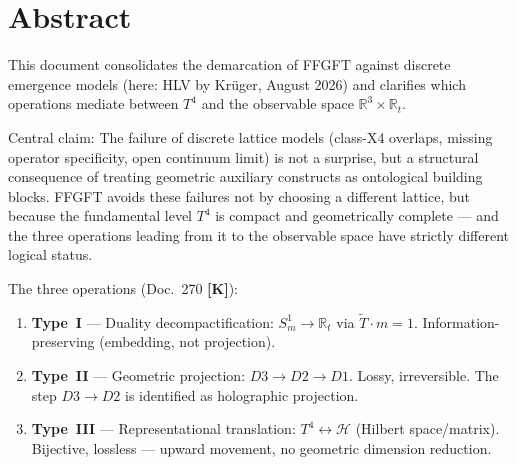 
\providecommand{\K}{}\renewcommand{\K}{\textbf{[K]}}
\providecommand{\B}{}\renewcommand{\B}{\textbf{[B]}}
\renewcommand{\S}{\textbf{[S]}}
\providecommand{\SETZ}{}\renewcommand{\SETZ}{\textbf{[SETZUNG]}}
\providecommand{\E}{}\renewcommand{\E}{\textbf{[E]}}
\providecommand{\lP}{}\renewcommand{\lP}{\ell_{\mathrm{P}}}
\providecommand{\Tmass}{}\renewcommand{\Tmass}{\tilde{T}}


\section*{Abstract}

This document consolidates the demarcation of FFGFT against discrete
emergence models (here: HLV by Krüger, August 2026) and clarifies
which operations mediate between $T^4$ and the observable space
$\mathbb{R}^3\times\mathbb{R}_t$.

Central claim: The failure of discrete lattice models (class-X4
overlaps, missing operator specificity, open continuum limit) is not
a surprise, but a structural consequence of treating geometric
auxiliary constructs as ontological building blocks. FFGFT avoids
these failures not by choosing a different lattice, but because the
fundamental level $T^4$ is compact and geometrically complete —
and the three operations leading from it to the observable space
have strictly different logical status.

The three operations (Doc.~270 \K):
\begin{enumerate}
  \item \textbf{Type~I} — Duality decompactification:
    $S^1_m \to \mathbb{R}_t$ via $\Tmass\cdot m = 1$.
    Information-preserving (embedding, not projection).
  \item \textbf{Type~II} — Geometric projection:
    $D3 \to D2 \to D1$. Lossy, irreversible.
    The step $D3 \to D2$ is identified as holographic projection.
  \item \textbf{Type~III} — Representational translation:
    $T^4 \leftrightarrow \mathcal{H}$ (Hilbert space/matrix).
    Bijective, lossless — upward movement, no geometric
    dimension reduction.
\end{enumerate}

